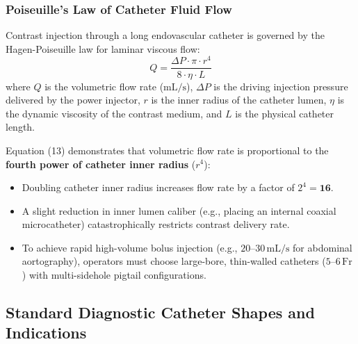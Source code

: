 \documentclass[11pt,a4paper]{article}
\begin{document}
\subsubsection{Poiseuille's Law of Catheter Fluid Flow}
Contrast injection through a long endovascular catheter is governed by the Hagen-Poiseuille law for laminar viscous flow:
\begin{equation}
    Q = \frac{\Delta P \cdot \pi \cdot r^4}{8 \cdot \eta \cdot L}
\end{equation}
where $Q$ is the volumetric flow rate ($\text{mL/s}$), $\Delta P$ is the driving injection pressure delivered by the power injector, $r$ is the inner radius of the catheter lumen, $\eta$ is the dynamic viscosity of the contrast medium, and $L$ is the physical catheter length.

\begin{physicsbox}
Equation (13) demonstrates that volumetric flow rate is proportional to the \textbf{fourth power of catheter inner radius} ($r^4$):
\begin{itemize}[leftmargin=*]
    \item Doubling catheter inner radius increases flow rate by a factor of $2^4 = \mathbf{16}$.
    \item A slight reduction in inner lumen caliber (e.g., placing an internal coaxial microcatheter) catastrophically restricts contrast delivery rate.
    \item To achieve rapid high-volume bolus injection (e.g., $20\text{--}30\,\text{mL/s}$ for abdominal aortography), operators must choose large-bore, thin-walled catheters ($5\text{--}6\,\text{Fr}$) with multi-sidehole pigtail configurations.
\end{itemize}
\end{physicsbox}

\subsection{Standard Diagnostic Catheter Shapes and Indications}
\end{document}
